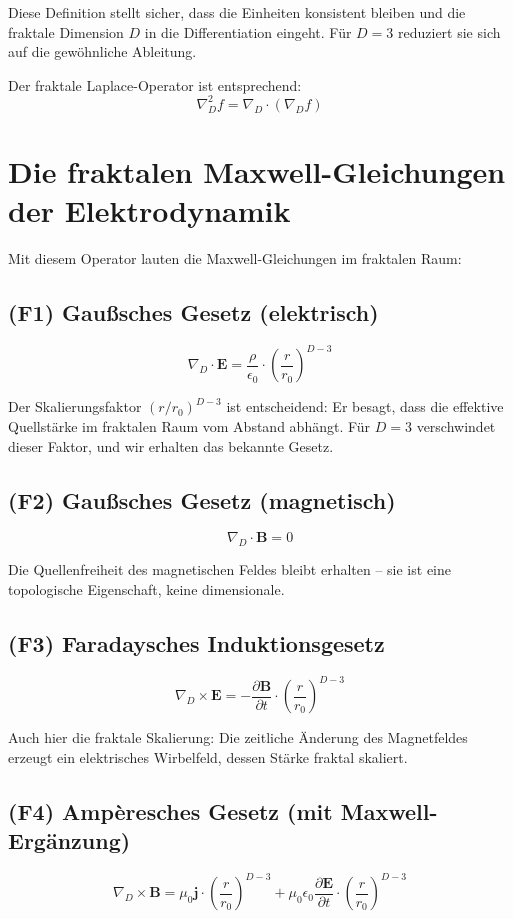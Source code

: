 \documentclass[12pt,a4paper]{article}
\begin{document}
Diese Definition stellt sicher, dass die Einheiten konsistent bleiben und die fraktale Dimension \(D\) in die Differentiation eingeht. Für \(D = 3\) reduziert sie sich auf die gewöhnliche Ableitung.

Der fraktale Laplace-Operator ist entsprechend:
\[
\nabla_D^2 f = \nabla_D \cdot (\nabla_D f)
\]

\section{Die fraktalen Maxwell-Gleichungen der Elektrodynamik}

Mit diesem Operator lauten die Maxwell-Gleichungen im fraktalen Raum:

\subsection{(F1) Gaußsches Gesetz (elektrisch)}
\[
\nabla_D \cdot \mathbf{E} = \frac{\rho}{\epsilon_0} \cdot \left( \frac{r}{r_0} \right)^{D-3}
\]

Der Skalierungsfaktor \((r/r_0)^{D-3}\) ist entscheidend: Er besagt, dass die effektive Quellstärke im fraktalen Raum vom Abstand abhängt. Für \(D = 3\) verschwindet dieser Faktor, und wir erhalten das bekannte Gesetz.

\subsection{(F2) Gaußsches Gesetz (magnetisch)}
\[
\nabla_D \cdot \mathbf{B} = 0
\]

Die Quellenfreiheit des magnetischen Feldes bleibt erhalten – sie ist eine topologische Eigenschaft, keine dimensionale.

\subsection{(F3) Faradaysches Induktionsgesetz}
\[
\nabla_D \times \mathbf{E} = -\frac{\partial \mathbf{B}}{\partial t} \cdot \left( \frac{r}{r_0} \right)^{D-3}
\]

Auch hier die fraktale Skalierung: Die zeitliche Änderung des Magnetfeldes erzeugt ein elektrisches Wirbelfeld, dessen Stärke fraktal skaliert.

\subsection{(F4) Ampèresches Gesetz (mit Maxwell-Ergänzung)}
\[
\nabla_D \times \mathbf{B} = \mu_0 \mathbf{j} \cdot \left( \frac{r}{r_0} \right)^{D-3} + \mu_0 \epsilon_0 \frac{\partial \mathbf{E}}{\partial t} \cdot \left( \frac{r}{r_0} \right)^{D-3}
\]
\end{document}
